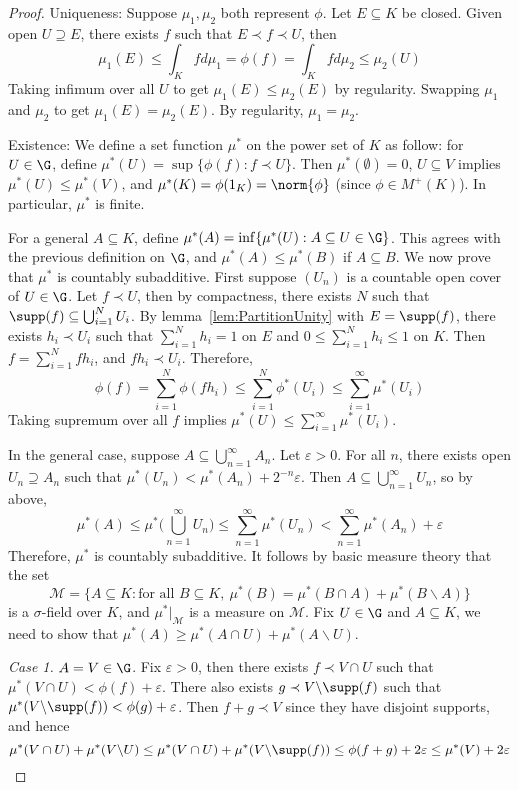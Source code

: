 \documentclass[a4paper]{article}
\begin{document}
\begin{proof}
	Uniqueness: Suppose $\mu_1,\mu_2$ both represent $\phi$. Let $E\subseteq K$ be closed. Given open $U\supseteq E$, there exists $f$ such that $E\prec f\prec U$, then
	\[
	 \mu_1(E)\leq\int_K fd\mu_1=\phi(f)=\int_K fd\mu_2\leq\mu_2(U)
	\]
	Taking infimum over all $U$ to get $\mu_1(E)\leq\mu_2(E)$ by regularity. Swapping $\mu_1$ and $\mu_2$ to get $\mu_1(E)=\mu_2(E)$. By regularity, $\mu_1=\mu_2$.

	Existence: We define a set function $\mu^*$ on the power set of $K$ as follow: for $U\in\G$, define $\mu^*(U)=\sup\{\phi(f):f\prec U\}$. Then $\mu^*(\emptyset)=0$, $U\subseteq V$ implies $\mu^*(U)\leq\mu^*(V)$, and $\mu^*(K)=\phi(1_K)=\norm{\phi}$ (since $\phi\in M^+(K)$). In particular, $\mu^*$ is finite.

	For a general $A\subseteq K$, define $\mu^*(A)=\inf\{\mu^*(U):A\subseteq U\in\G\}$. This agrees with the previous definition on $\G$, and $\mu^*(A)\leq\mu^*(B)$ if $A\subseteq B$. We now prove that $\mu^*$ is countably subadditive. First suppose $(U_n)$ is a countable open cover of $U\in\G$. Let $f\prec U$, then by compactness, there exists $N$ such that $\supp(f)\subseteq\bigcup_{i=1}^N U_i$. By lemma~\ref{lem:PartitionUnity} with $E=\supp(f)$, there exists $h_i\prec U_i$ such that $\sum_{i=1}^N h_i=1$ on $E$ and $0\leq\sum_{i=1}^N h_i\leq 1$ on $K$. Then $f=\sum_{i=1}^N fh_i$, and $fh_i\prec U_i$. Therefore,
	\[
	 \phi(f)=\sum_{i=1}^N\phi(fh_i)\leq\sum_{i=1}^N\phi^*(U_i) \leq\sum_{i=1}^\infty\mu^*(U_i)
	\]
	Taking supremum over all $f$ implies $\mu^*(U)\leq\sum_{i=1}^\infty\mu^*(U_i)$.

	In the general case, suppose $A\subseteq\bigcup_{n=1}^\infty A_n$. Let $\varepsilon>0$. For all $n$, there exists open $U_n\supseteq A_n$ such that $\mu^*(U_n)<\mu^*(A_n)+2^{-n}\varepsilon$. Then $A\subseteq\bigcup_{n=1}^\infty U_n$, so by above,
	\[
	 \mu^*(A)\leq\mu^*\Big(\bigcup_{n=1}^\infty U_n\Big)\leq\sum_{n=1}^\infty\mu^*(U_n)<\sum_{n=1}^\infty\mu^*(A_n) +\varepsilon
	\]
	Therefore, $\mu^*$ is countably subadditive. It follows by basic measure theory that the set
	\[
	 \mathcal{M}=\{A\subseteq K:\text{for all }B\subseteq K,\ \mu^*(B)=\mu^*(B\cap A)+\mu^*(B\backslash A)\}
	\]
	is a $\sigma$-field over $K$, and $\mu^*|_\mathcal{M}$ is a measure on $\mathcal{M}$. Fix $U\in\G$ and $A\subseteq K$, we need to show that $\mu^*(A)\geq\mu^*(A\cap U)+\mu^*(A\backslash U)$.

	\emph{Case 1.} $A=V\in\G$. Fix $\varepsilon>0$, then there exists $f\prec V\cap U$ such that $\mu^*(V\cap U)<\phi(f)+\varepsilon$. There also exists $g\prec V\backslash\supp(f)$ such that $\mu^*(V\backslash\supp(f))<\phi(g)+\varepsilon$. Then $f+g\prec V$ since they have disjoint supports, and hence
	\[
	 \mu^*(V\cap U)+\mu^*(V\backslash U)\leq\mu^*(V\cap U)+\mu^*(V\backslash\supp(f))\leq\phi(f+g)+ 2\varepsilon\leq\mu^*(V)+2\varepsilon
	\]


\end{proof}
\end{document}
